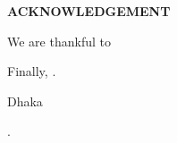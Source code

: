 \begin{center}
  \textbf{{\Large ACKNOWLEDGEMENT}}\\[60pt]
\end{center}

We are thankful to 


Finally, .

\vspace*{20.0mm}

\begin{minipage}[t]{0.2\textwidth}
  Dhaka\par
  \thesisdate\par
  {\tiny .}
\end{minipage}
\hfill
\begin{minipage}[t]{0.45\textwidth}
  \begin{enumerate}
  \end{enumerate}
\end{minipage}

\endinput

